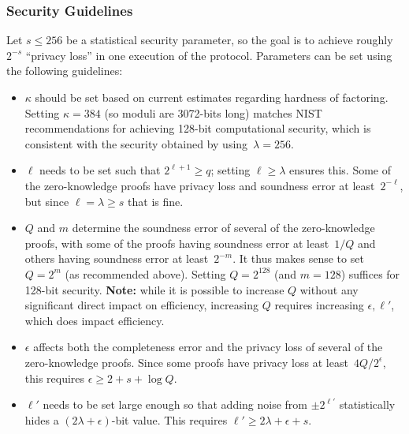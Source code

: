 \documentclass[11pt]{article}
\newcommand{\?}[1]{\stackrel{?}{#1}}
\begin{document}
\subsubsection{Security Guidelines}
Let $s\leq 256$ be a statistical security parameter, so the goal is to achieve roughly $2^{-s}$ 
``privacy loss'' in one execution of the protocol. %
Parameters can be set using the following guidelines: 
\begin{itemize}
    \item $\kappa$ should be set based on current estimates regarding hardness of factoring. 
    Setting $\kappa=384$ (so moduli are 3072-bits long) matches NIST recommendations for achieving 128-bit computational security, which is consistent with the security obtained by using~$\lambda=256$.
    
    \item $\ell$ needs to be set such that $2^{\ell+1}\geq q$; setting $\ell \geq \lambda$ ensures this.
Some of the zero-knowledge proofs have privacy loss and soundness error at least~$2^{-\ell}$, but since $\ell = \lambda \geq s$ that is fine.
    
    \item $Q$ and $m$ determine the soundness error of several of the zero-knowledge proofs, with some of the proofs having soundness error at least~$1/Q$ and others having soundness error at least~$2^{-m}$. It thus makes sense to set $Q=2^m$ (as recommended above).    
    Setting $Q=2^{128}$ (and $m=128$) suffices for 128-bit security.  {\bf Note:} while it is possible to increase $Q$ without any significant direct impact on efficiency, increasing $Q$ requires increasing $\epsilon, \ell'$, which does impact efficiency. 
    
    \item $\epsilon$ affects both the completeness error and the privacy loss of several of the zero-knowledge proofs. 
    Since 
    some proofs have privacy loss at least~$4Q/2^\epsilon$, this requires $\epsilon \geq 2+s+\log Q$.

    \item $\ell'$ needs to be set large enough so that adding noise from $\pm 2^{\ell'}$ statistically hides a $(2\lambda+\epsilon)$-bit value. This requires $\ell' \geq 2\lambda + \epsilon + s$.
\end{itemize}
\end{document}

